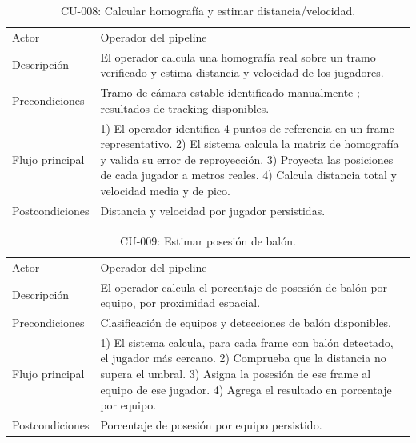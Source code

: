 \begin{table}[htp]
\centering
\caption{CU-008: Calcular homografía y estimar distancia/velocidad.}
\label{tab:cu-008}
\renewcommand{\arraystretch}{1.2}
\begin{tabular}{|p{3.1cm}|p{9.2cm}|}
\hline
\rowcolor{gray!25}
\multicolumn{2}{|l|}{\textbf{CU-008 -- Calcular homografía y estimar distancia/velocidad}} \\
\hline
Actor & Operador del pipeline \\
\hline
Descripción & El operador calcula una homografía real sobre un tramo
  verificado y estima distancia y velocidad de los jugadores. \\
\hline
Precondiciones & Tramo de cámara estable identificado manualmente
; resultados de tracking disponibles. \\
\hline
Flujo principal & 1) El operador identifica 4 puntos de referencia en un
  frame representativo. 2) El sistema calcula la matriz de homografía y
  valida su error de reproyección. 3) Proyecta las posiciones de cada
  jugador a metros reales. 4) Calcula distancia total y velocidad media y
  de pico. \\
\hline
Postcondiciones & Distancia y velocidad por jugador persistidas. \\
\hline
\end{tabular}
\end{table}

\begin{table}[htp]
\centering
\caption{CU-009: Estimar posesión de balón.}
\label{tab:cu-009}
\renewcommand{\arraystretch}{1.2}
\begin{tabular}{|p{3.1cm}|p{9.2cm}|}
\hline
\rowcolor{gray!25}
\multicolumn{2}{|l|}{\textbf{CU-009 -- Estimar posesión de balón}} \\
\hline
Actor & Operador del pipeline \\
\hline
Descripción & El operador calcula el porcentaje de posesión de balón por
  equipo, por proximidad espacial. \\
\hline
Precondiciones & Clasificación de equipos y detecciones de balón
 disponibles. \\
\hline
Flujo principal & 1) El sistema calcula, para cada frame con balón
  detectado, el jugador más cercano. 2) Comprueba que la distancia no
  supera el umbral. 3) Asigna la posesión de ese frame al equipo
  de ese jugador. 4) Agrega el resultado en porcentaje por equipo. \\
\hline
Postcondiciones & Porcentaje de posesión por equipo persistido. \\
\hline
\end{tabular}
\end{table}

